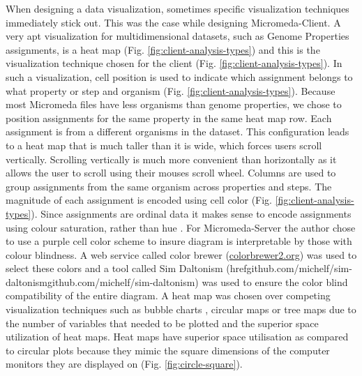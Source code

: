 When designing a data visualization, sometimes specific visualization techniques immediately stick out. This was the case while designing Micromeda-Client. A very apt visualization for multidimensional datasets, such as Genome Properties assignments, is a heat map \cite{wilkinson2009history,tufte2001visual}(Fig. \ref{fig:client-analysis-types}) and this is the visualization technique chosen for the client (Fig. \ref{fig:client-analysis-types}). In such a visualization, cell position is used to indicate which assignment belongs to what property or step and organism (Fig. \ref{fig:client-analysis-types}). Because most Micromeda files have less organisms than genome properties, we chose to position assignments for the same property in the same heat map row. Each assignment is from a different organisms in the dataset. This configuration leads to a heat map that is much taller than it is wide, which forces users scroll vertically. Scrolling vertically is much more convenient than horizontally as it allows the user to scroll using their mouses scroll wheel. Columns are used to group assignments from the same organism across properties and steps. The magnitude of each assignment is encoded using cell color (Fig. \ref{fig:client-analysis-types}). Since assignments are ordinal data it makes sense to encode assignments using colour saturation, rather than hue \cite{munzner2015visualization}. For Micromeda-Server the author chose to use a purple cell color scheme to insure diagram is interpretable by those with colour blindness. A web service called color brewer (\href{colorbrewer2.org}{colorbrewer2.org}) was used to select these colors and a tool called Sim Daltonism (href{github.com/michelf/sim-daltonism}{github.com/michelf/sim-daltonism}) was used to ensure the color blind compatibility of the entire diagram. A heat map was chosen over competing visualization techniques such as bubble charts \cite{tufte2001visual}, circular maps \cite{ward2002taxonomy,stothard2004circular} or tree maps \cite{shneiderman1998tree} due to the number of variables that needed to be plotted and the superior space utilization of heat maps. Heat maps have superior space utilisation as compared to circular plots because they mimic the square dimensions of the computer monitors they are displayed on (Fig. \ref{fig:circle-square}).

